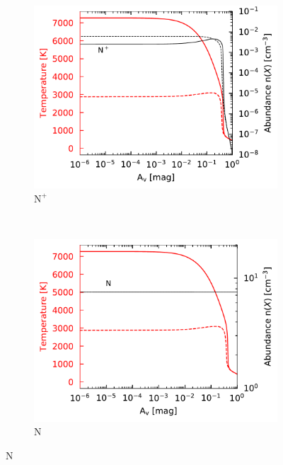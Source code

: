 \begin{appendices}
\begin{figure}[!h]
    \centering
    \begin{subfigure}[t]{0.49\textwidth} %
        \centering \includegraphics[trim = {0 0 0 0},clip,width=1\textwidth]{figure/Cl/gridModelEmiss/nT_comp_Np.pdf}
        \caption{$\mathrm{N}^+$}
    \end{subfigure}
    ~ 
   \begin{subfigure}[t]{0.49\textwidth} %
        \centering \includegraphics[trim = {0 0 0 0},clip,width=1\textwidth]{figure/Cl/gridModelEmiss/nT_comp_N.pdf}
        \caption{$\mathrm{N}$}
    \end{subfigure}
    

\end{figure}
\end{appendices}
